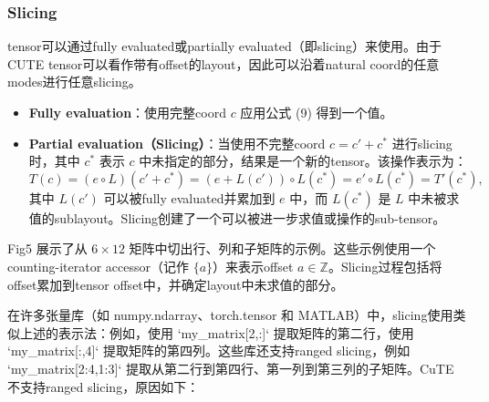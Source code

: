 \documentclass{article}
\begin{document}
\subsubsection{Slicing}
tensor可以通过fully evaluated或partially evaluated（即slicing）来使用。由于 CUTE tensor可以看作带有offset的layout，因此可以沿着natural coord的任意modes进行任意slicing。

\begin{itemize}
\item \textbf{Fully evaluation}：使用完整coord \( c \) 应用公式 (9) 得到一个值。
\item \textbf{Partial evaluation（Slicing）}：当使用不完整coord \( c = c' + c^* \) 进行slicing时，其中 \( c^* \) 表示 \( c \) 中未指定的部分，结果是一个新的tensor。该操作表示为：
\[
T(c) = (e \circ L)(c' + c^*) = (e + L(c')) \circ L(c^*) = e' \circ L(c^*) = T'(c^*),
\tag{10}
\]
其中 \( L(c') \) 可以被fully evaluated并累加到 \( e \) 中，而 \( L(c^*) \) 是 \( L \) 中未被求值的sublayout。Slicing创建了一个可以被进一步求值或操作的sub-tensor。
\end{itemize}

Fig5 展示了从 \(6 \times 12\) 矩阵中切出行、列和子矩阵的示例。这些示例使用一个counting-iterator accessor（记作 \(\{a\}\)）来表示offset \( a \in \mathbb{Z} \)。Slicing过程包括将offset累加到tensor offset中，并确定layout中未求值的部分。

在许多张量库（如 numpy.ndarray、torch.tensor 和 MATLAB）中，slicing使用类似上述的表示法：例如，使用 `my\_matrix[2,:]` 提取矩阵的第二行，使用 `my\_matrix[:,4]` 提取矩阵的第四列。这些库还支持ranged slicing，例如 `my\_matrix[2:4,1:3]` 提取从第二行到第四行、第一列到第三列的子矩阵。CuTE 不支持ranged slicing，原因如下：
\end{document}
